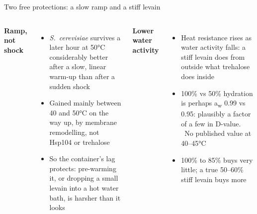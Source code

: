 \documentclass[aspectratio=169,11pt]{beamer}
\begin{document}
\begin{frame}{Two free protections: a slow ramp and a stiff levain}
  \begin{columns}[T]
      {\color{crust}\textbf{Ramp, not shock}}
      \begin{itemize}\footnotesize\setlength{\itemsep}{1pt}
        \item \textit{S.~cerevisiae} survives a later hour at 50°C considerably better
          after a slow, linear warm-up than after a sudden shock
        \item Gained mainly between 40 and 50°C on the way up, by membrane remodelling,
          not Hsp104 or trehalose
        \item So the container's lag protects: pre-warming it, or dropping a small levain
          into a hot water bath, is harsher than it looks
      \end{itemize}
      {\color{crust}\textbf{Lower water activity}}
      \begin{itemize}\footnotesize\setlength{\itemsep}{1pt}
        \item Heat resistance rises as water activity falls: a stiff levain does from
          outside what trehalose does inside
        \item 100\% vs 50\% hydration is perhaps a\textsubscript{w} 0.99 vs 0.95: plausibly
          a factor of a few in D-value. \untested\ No published value at 40–45°C
        \item 100\% to 85\% buys very little; a true 50–60\% stiff levain buys more
      \end{itemize}
  \end{columns}
\end{frame}
\end{document}
